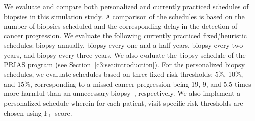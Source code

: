 We evaluate and compare both personalized and currently practiced schedules of biopsies in this simulation study. A comparison of the schedules is based on the number of biopsies scheduled and the corresponding delay in the detection of cancer progression. We evaluate the following currently practiced fixed/heuristic schedules: biopsy annually, biopsy every one and a half years, biopsy every two years, and biopsy every three years. We also evaluate the biopsy schedule of the PRIAS program (see Section~\ref{c3:sec:introduction}). For the personalized biopsy schedules, we evaluate schedules based on three fixed risk thresholds: 5\%, 10\%, and 15\%, corresponding to a missed cancer progression being 19, 9, and 5.5 times more harmful than an unnecessary biopsy~\citep{vickers2006decision}, respectively. We also implement a personalized schedule wherein for each patient, visit-specific risk thresholds are chosen using $\mbox{F}_1$~score.